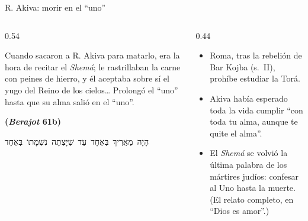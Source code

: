 \documentclass[hyperref={bookmarks=false},aspectratio=169]{beamer}
\newcommand{\heb}[1]{\mbox{\foreignlanguage{hebrew}{#1}}}
\newcommand{\fuente}[1]{\par\hfill{\upshape\bfseries\footnotesize\textcolor{azul}{#1}}}
\begin{document}
\begin{frame}{R. Akiva: morir en el ``uno''}
\begin{columns}[c,onlytextwidth]
\begin{column}{0.54\textwidth}
\begin{cita}[colback=dorado!10!papiro,colframe=dorado!80!azul,fontupper=\scriptsize\itshape]Cuando sacaron a R. Akiva para matarlo, era la hora de recitar el \emph{Shemá}; le rastrillaban la carne con peines de hierro, y él aceptaba sobre sí el yugo del Reino de los cielos\ldots{} Prolongó el ``uno'' hasta que su alma salió en el ``uno''.\fuente{(\emph{Berajot} 61b)}\end{cita}
\begin{center}\scriptsize\heb{הָיָה מַאֲרִיךְ בְּאֶחָד עַד שֶׁיָּצְתָה נִשְׁמָתוֹ בְּאֶחָד}\end{center}
\end{column}
\begin{column}{0.44\textwidth}\small
\begin{itemize}
\item Roma, tras la rebelión de Bar Kojba (s.~II), prohíbe estudiar la Torá.
\item Akiva había esperado toda la vida cumplir ``con toda tu alma, aunque te quite el alma''.
\item El \emph{Shemá} se volvió la última palabra de los mártires judíos: confesar al Uno hasta la muerte. (El relato completo, en ``Dios es amor''.)
\end{itemize}
\end{column}
\end{columns}
\end{frame}
\end{document}
